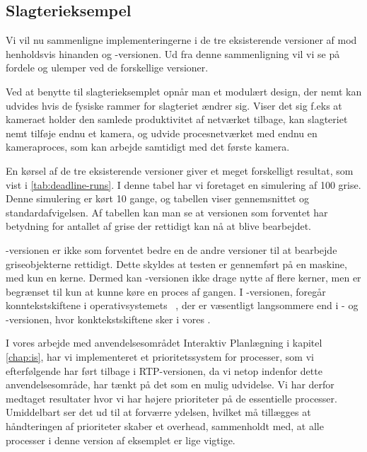 \subsection{Slagterieksempel}

Vi vil nu sammenligne implementeringerne i de tre eksisterende versioner af \pycsp mod henholdsvis hinanden og -versionen. Ud fra denne sammenligning vil vi se på fordele og ulemper ved de forskellige versioner.

Ved at benytte \pycsp til slagterieksemplet opnår man et modulært design, der nemt kan udvides hvis de fysiske rammer for slagteriet ændrer sig. Viser det sig f.eks at kameraet holder den samlede produktivitet af netværket tilbage, kan slagteriet nemt tilføje endnu et kamera, og udvide procesnetværket med endnu en kameraproces, som kan arbejde samtidigt med det første kamera. 

En kørsel af de tre eksisterende versioner giver et meget forskelligt resultat, som vist i \cref{tab:deadline-runs}. I denne tabel har vi foretaget en simulering af 100 grise. Denne simulering er kørt 10 gange, og tabellen viser gennemsnittet og standardafvigelsen. Af tabellen kan man se at versionen som forventet har betydning for antallet af grise der rettidigt kan nå at blive bearbejdet. 

-versionen er ikke som forventet bedre en de andre versioner til at bearbejde griseobjekterne rettidigt. Dette skyldes at testen er gennemført på en maskine, med kun en kerne.  Dermed kan -versionen ikke drage nytte  af flere kerner, men er begrænset til kun at kunne køre en proces af gangen. I -versionen, foregår konntekstskiftene i operativsystemets \sched~, der er væsentligt langsommere end i - og -versionen, hvor konktekstskiftene sker i vores \sched. 

I vores arbejde med anvendelsesområdet Interaktiv Planlægning i kapitel \ref{chap:is}, har vi implementeret et prioritetssystem for processer, som vi efterfølgende har ført tilbage i RTP-versionen, da vi netop indenfor dette anvendelsesområde, har tænkt på det som en mulig udvidelse. Vi har derfor medtaget resultater hvor vi har højere prioriteter på de essentielle processer. Umiddelbart ser det ud til at forværre ydelsen, hvilket må tillægges at håndteringen af prioriteter skaber et overhead, sammenholdt med, at alle processer i denne version af eksemplet er lige vigtige. 


